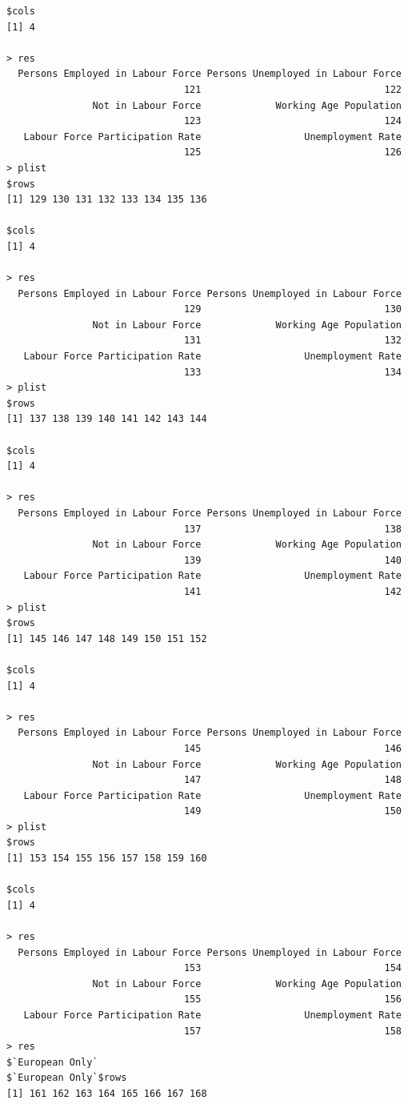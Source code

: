 \documentclass[a4paper]{article}
\begin{document}
\begin{verbatim}
$cols
[1] 4

> res 
  Persons Employed in Labour Force Persons Unemployed in Labour Force 
                               121                                122 
               Not in Labour Force             Working Age Population 
                               123                                124 
   Labour Force Participation Rate                  Unemployment Rate 
                               125                                126 
> plist 
$rows
[1] 129 130 131 132 133 134 135 136

$cols
[1] 4

> res 
  Persons Employed in Labour Force Persons Unemployed in Labour Force 
                               129                                130 
               Not in Labour Force             Working Age Population 
                               131                                132 
   Labour Force Participation Rate                  Unemployment Rate 
                               133                                134 
> plist 
$rows
[1] 137 138 139 140 141 142 143 144

$cols
[1] 4

> res 
  Persons Employed in Labour Force Persons Unemployed in Labour Force 
                               137                                138 
               Not in Labour Force             Working Age Population 
                               139                                140 
   Labour Force Participation Rate                  Unemployment Rate 
                               141                                142 
> plist 
$rows
[1] 145 146 147 148 149 150 151 152

$cols
[1] 4

> res 
  Persons Employed in Labour Force Persons Unemployed in Labour Force 
                               145                                146 
               Not in Labour Force             Working Age Population 
                               147                                148 
   Labour Force Participation Rate                  Unemployment Rate 
                               149                                150 
> plist 
$rows
[1] 153 154 155 156 157 158 159 160

$cols
[1] 4

> res 
  Persons Employed in Labour Force Persons Unemployed in Labour Force 
                               153                                154 
               Not in Labour Force             Working Age Population 
                               155                                156 
   Labour Force Participation Rate                  Unemployment Rate 
                               157                                158 
> res 
$`European Only`
$`European Only`$rows
[1] 161 162 163 164 165 166 167 168


\end{verbatim}
\end{document}
